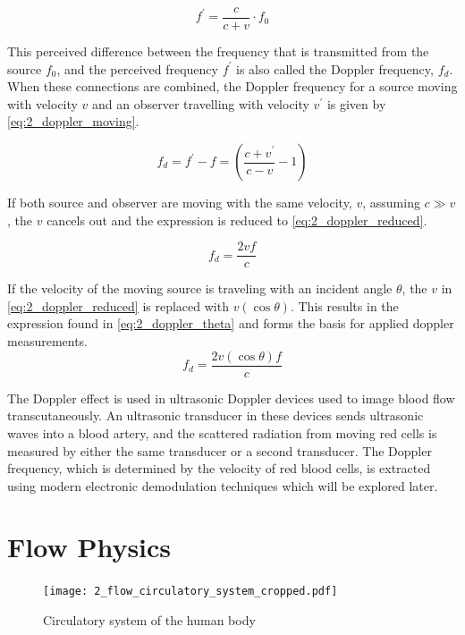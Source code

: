 \begin{equation} \label{eq:2_doppler_effect2}
	f^{\prime} = \frac{c}{c+v} \cdot f_{0}
\end{equation}

This perceived difference between the frequency that is transmitted from the source $f_{0}$, and the perceived frequency $f^{\prime}$ is also called the Doppler frequency, $f_{d}$. When these connections are combined, the Doppler frequency for a source moving with velocity $v$ and an observer travelling with velocity $v^{\prime}$ is given by \cref{eq:2_doppler_moving}.

\begin{equation} \label{eq:2_doppler_moving}
	f_{d} = f^{\prime} - f = \left( \frac{c + v^{\prime}}{c - v}-1 \right)
\end{equation}

If both source and observer are moving with the same velocity, $v$, assuming $c\gg v$, the $v$ cancels out and the expression is reduced to \cref{eq:2_doppler_reduced}.

\begin{equation} \label{eq:2_doppler_reduced}
	f_{d} = \frac{2 v f}{c}
\end{equation}

If the velocity of the moving source is traveling with an incident angle $\theta$, the $v$ in \cref{eq:2_doppler_reduced} is replaced with $v (\cos\theta)$. This results in the expression found in \cref{eq:2_doppler_theta} and forms the basis for applied \gls{doppler} measurements.
\begin{equation} \label{eq:2_doppler_theta}
	f_{d} = \frac{2 v(\cos\theta) f}{c}
\end{equation}

The Doppler effect is used in ultrasonic Doppler devices used to image blood flow \gls{transcutaneous}ly. An ultrasonic transducer in these devices sends ultrasonic waves into a blood artery, and the scattered radiation from moving red cells is measured by either the same transducer or a second transducer. The Doppler frequency, which is determined by the velocity of red blood cells, is extracted using modern electronic demodulation techniques which will be explored later.

\section{Flow Physics}
\begin{figure}[htbp]
	\centering
	\texttt{[image: 2\_flow\_circulatory\_system\_cropped.pdf]}
	\caption[Circulatory system of the human body]{Circulatory system of the human body \cite{JensenUltrasoundBook}}
	\label{fig:2_circulatory_system}
\end{figure}

